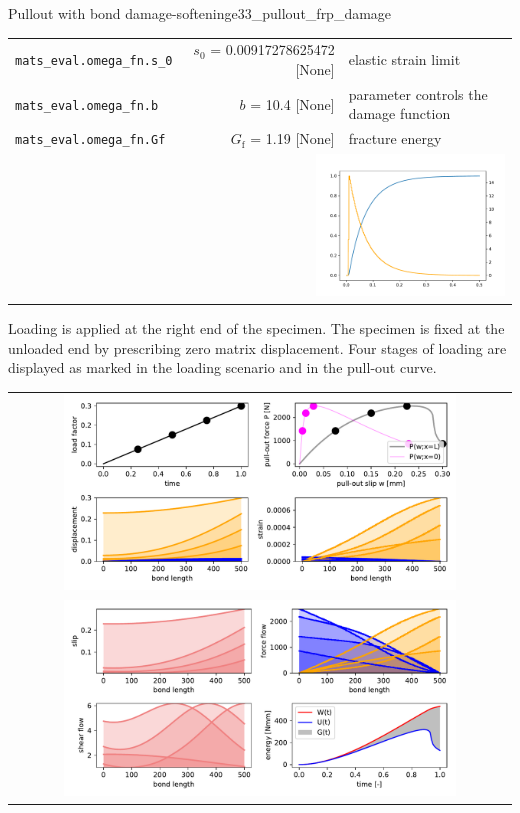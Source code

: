 \documentclass[main.tex]{subfiles}
\begin{document}
\begin{bmcsex}{Pullout with bond damage-softening}{e33_pullout_frp_damage}
\begin{center}
{\begin{longtable}{lrp{4cm}}
\texttt{mats\_eval.omega\_fn.s\_0} & $s_0$ = 0.00917278625472 [None] & {\footnotesize elastic strain limit}  \\
            \texttt{mats\_eval.omega\_fn.b} & $b$ = 10.4 [None] & {\footnotesize parameter controls the damage function}  \\
            \texttt{mats\_eval.omega\_fn.Gf} & $G_\mathrm{f}$ = 1.19 [None] & {\footnotesize fracture energy}  \\
            
\multicolumn{3}{r}{\includegraphics[width=5cm]{examples/e33_pullout_frp_damage/fig_FRP_damage_function.pdf}}\\
\bottomrule 
\end{longtable}
}

    Loading is applied at the right end of the specimen. The specimen
    is fixed at the unloaded end by prescribing zero matrix displacement. 
    Four stages of loading are displayed as marked in the
    loading scenario and in the pull-out curve.
    \begin{longtable}{c}
\mbox{
    \includegraphics[width=0.8\textwidth]{examples/e33_pullout_frp_damage/fig_frictional_bond01.pdf}
    }\\
    
    \mbox{\includegraphics[width=0.8\textwidth]{examples/e33_pullout_frp_damage/fig_frictional_bond02.pdf}}

    
    \end{longtable}
    \end{center}
            \end{bmcsex}
\end{document}
